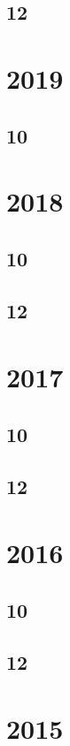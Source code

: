 \documentclass[11pt]{book}
\begin{document}
\subsection{12}



\section{2019} 
\subsection{10}

\section{2018} 
\subsection{10}


\subsection{12}




\section{2017}
\subsection{10}

\subsection{12}




\section{2016}
\subsection{10}

\subsection{12}

\section{2015}
\end{document}
